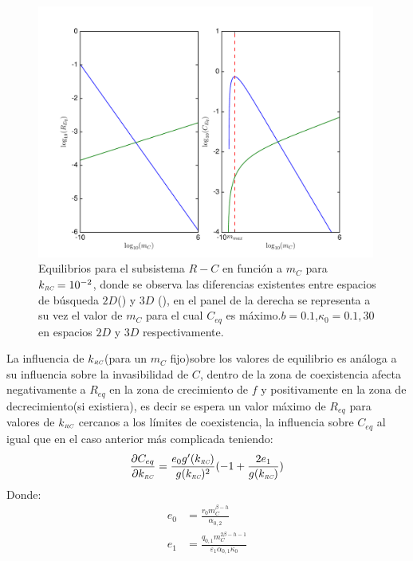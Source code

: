 \begin{figure}
  \centering
  \includegraphics[width = 0.99\textwidth]{./Plots/RCeq.pdf}
  \caption[Equilibrio $R-C$vs$m_C$]{Equilibrios para el subsistema $R-C$ en funci\'on a $m_C$ para $k_{\textit{\tiny RC}} = 10^{-2}$, donde se observa las diferencias existentes entre espacios de b\'usqueda $2D$({\hwplotG}) y $3D$ ({\hwplotB}), en el panel de la derecha se representa a su vez el valor de $m_C$ para el cual $C_{eq}$ es m\'aximo.$b = 0.1$,$\kappa_0 = 0.1 , 30$  en espacios $2D$ y $3D$ respectivamente.}
  \label{fig:EqRCmC}
\end{figure}

La influencia de $k_{\textit{\tiny RC}}$(para un $m_C$ fijo)sobre los valores de equilibrio es an\'aloga a su influencia sobre la invasibilidad de $C$, dentro de la zona de coexistencia afecta negativamente a $R_{eq}$ en la zona de crecimiento de $f$ y positivamente en la zona de decrecimiento(si existiera), es decir se espera un valor m\'aximo de $R_{eq}$ para valores de $k_{\textit{\tiny RC}}$ cercanos a los l\'imites de coexistencia, la influencia sobre $C_{eq}$ al igual que en el caso anterior m\'as complicada teniendo:
\begin{equation}
  \frac{\partial C_{eq}}{\partial k_{\textit{\tiny RC}}}  = \frac{e_0 g'(k_{\textit{\tiny RC}}) }{g(k_{\textit{\tiny RC}})^2} ( -1  + \frac{2e_1}{g(k_{\textit{\tiny RC}})})
\end{equation}
Donde:
\begin{equation}
  \begin{aligned}
    e_0 &=  \frac{r_0 m_C^{\beta -h}}{\alpha_{0,2}} \\
    e_1 &=  \frac{q_{0,1} m_C^{2\beta-h-1}}{\varepsilon_1 \alpha_{0,1} \kappa_0}
  \end{aligned}
\end{equation}


